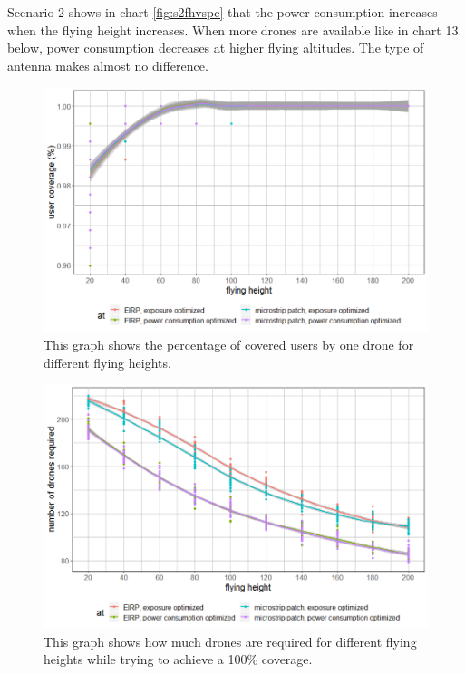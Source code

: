 Scenario 2 shows in chart \ref{fig:s2fhvspc} that the power consumption increases when the flying height increases. 
When more drones are available like in chart 13 below, power consumption decreases at higher flying altitudes. 
The type of antenna makes almost no difference.

\begin{figure}[]
  \includegraphics[width=\textwidth]{../results/s3/fhvscov.png}
  \caption{This graph shows the percentage of covered users by one drone for different flying heights.}
  \label{fig:s3fhvscov}
\end{figure}

\begin{figure}[]
  \includegraphics[width=\textwidth]{../results/s3/fhvsnumdrones.png}
  \caption{This graph shows how much drones are required for different flying heights while trying to achieve a 100\% coverage.}
  \label{fig:s3fhvscov}
\end{figure}

